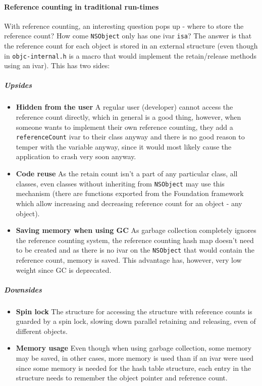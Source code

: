 \paragraph{Reference counting in traditional run-times} With reference counting, an interesting question pops up - where to store the reference count? How come \verb=NSObject= only has one ivar \verb=isa=? The answer is that the reference count for each object is stored in an external structure (even though in \verb=objc-internal.h= is a macro that would implement the retain/release methods using an ivar). This has two sides:
\subparagraph{Upsides}
\begin{itemize}
  \item{\bf{Hidden from the user}} A regular user (developer) cannot access the reference count directly, which in general is a good thing, however, when someone wants to implement their own reference counting, they add a \verb=referenceCount= ivar to their class anyway and there is no good reason to temper with the variable anyway, since it would most likely cause the application to crash very soon anyway.
  \item{\bf{Code reuse}} As the retain count isn't a part of any particular class, all classes, even classes without inheriting from \verb=NSObject= may use this mechanism (there are functions exported from the Foundation framework which allow increasing and decreasing reference count for an object - any object).
  \item{\bf{Saving memory when using GC}} As garbage collection completely ignores the reference counting system, the reference counting hash map doesn't need to be created and as there is no ivar on the \verb=NSObject= that would contain the reference count, memory is saved. This advantage has, however, very low weight since GC is deprecated.
\end{itemize}
\subparagraph{Downsides}
\begin{itemize}
  \item{\bf{Spin lock}} The structure for accessing the structure with reference counts is guarded by a spin lock, slowing down parallel retaining and releasing, even of different objects.
  \item{\bf{Memory usage}} Even though when using garbage collection, some memory may be saved, in other cases, more memory is used than if an ivar were used since some memory is needed for the hash table structure, each entry in the structure needs to remember the object pointer and reference count.
\end{itemize}
